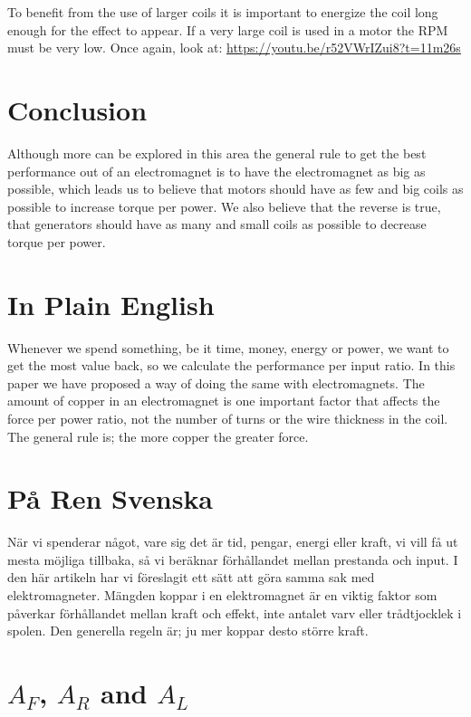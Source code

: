 \documentclass[]{../common/elementary-physics}
\begin{document}
To benefit from the use of larger coils it is important to energize the coil long enough for the effect to appear.
If a very large coil is used in a motor the RPM must be very low.
Once again, look at: \url{https://youtu.be/r52VWrIZui8?t=11m26s}

\section{Conclusion}

Although more can be explored in this area the general rule to get the best performance out of an electromagnet is to have the electromagnet as big as possible, which leads us to believe that motors should have as few and big coils as possible\cite{jonew} to increase torque per power.
We also believe that the reverse is true, that generators should have as many and small coils as possible to decrease torque per power.

\appendix

\section{In Plain English}

Whenever we spend something, be it time, money, energy or power, we want to get the most value back, so we calculate the performance per input ratio.
In this paper we have proposed a way of doing the same with electromagnets.
The amount of copper in an electromagnet is one important factor that affects the force per power ratio, not the number of turns or the wire thickness in the coil.
The general rule is; the more copper the greater force.

\section{På Ren Svenska}

När vi spenderar något, vare sig det är tid, pengar, energi eller kraft, vi vill få ut mesta möjliga tillbaka, så vi beräknar förhållandet mellan prestanda och input.
I den här artikeln har vi föreslagit ett sätt att göra samma sak med elektromagneter.
Mängden koppar i en elektromagnet är en viktig faktor som påverkar förhållandet mellan kraft och effekt, inte antalet varv eller trådtjocklek i spolen.
Den generella regeln är; ju mer koppar desto större kraft.

\section{$A_F$, $A_R$ and $A_L$}
\end{document}
